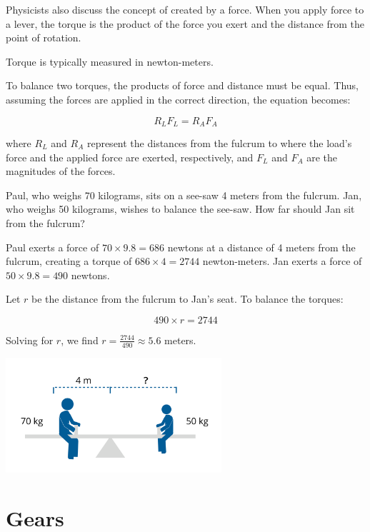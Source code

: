 Physicists also discuss the concept of  created by a force. When you apply force to a lever, the torque is the product of the force you exert and the distance from the point of rotation.

Torque is typically measured in newton-meters.

To balance two torques, the products of force and distance must be equal. Thus, assuming the forces are applied in the correct direction, the equation becomes:

\[
R_L F_L = R_A F_A
\]

where \( R_L \) and \( R_A \) represent the distances from the fulcrum to where the load’s force and the applied force are exerted, respectively, and \( F_L \) and \( F_A \) are the magnitudes of the forces.

\begin{Exercise}[title={Lever}, label=lever]
Paul, who weighs 70 kilograms, sits on a see-saw 4 meters from the fulcrum. Jan, who weighs 50 kilograms, wishes to balance the see-saw. How far should Jan sit from the fulcrum?
\end{Exercise}
\begin{Answer}[ref=lever]
Paul exerts a force of \( 70 \times 9.8 = 686 \) newtons at a distance of 4 meters from the fulcrum, creating a torque of \( 686 \times 4 = 2744 \) newton-meters. Jan exerts a force of \( 50 \times 9.8 = 490 \) newtons.

Let \( r \) be the distance from the fulcrum to Jan's seat. To balance the torques:

\[
490 \times r = 2744
\]

Solving for \( r \), we find \( r = \frac{2744}{490} \approx 5.6 \) meters.
\end{Answer}

\includegraphics[width=0.6\textwidth]{seesaw.png}

\section{Gears}

